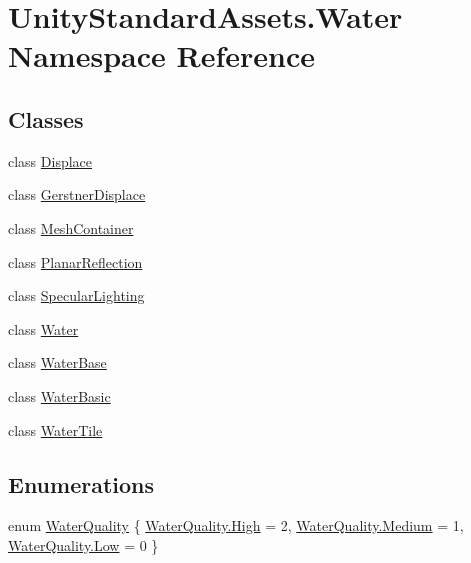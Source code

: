 \hypertarget{namespace_unity_standard_assets_1_1_water}{}\section{Unity\+Standard\+Assets.\+Water Namespace Reference}
\label{namespace_unity_standard_assets_1_1_water}
\subsection*{Classes}
\begin{DoxyCompactItemize}
\item 
class \mbox{\hyperlink{class_unity_standard_assets_1_1_water_1_1_displace}{Displace}}
\item 
class \mbox{\hyperlink{class_unity_standard_assets_1_1_water_1_1_gerstner_displace}{Gerstner\+Displace}}
\item 
class \mbox{\hyperlink{class_unity_standard_assets_1_1_water_1_1_mesh_container}{Mesh\+Container}}
\item 
class \mbox{\hyperlink{class_unity_standard_assets_1_1_water_1_1_planar_reflection}{Planar\+Reflection}}
\item 
class \mbox{\hyperlink{class_unity_standard_assets_1_1_water_1_1_specular_lighting}{Specular\+Lighting}}
\item 
class \mbox{\hyperlink{class_unity_standard_assets_1_1_water_1_1_water}{Water}}
\item 
class \mbox{\hyperlink{class_unity_standard_assets_1_1_water_1_1_water_base}{Water\+Base}}
\item 
class \mbox{\hyperlink{class_unity_standard_assets_1_1_water_1_1_water_basic}{Water\+Basic}}
\item 
class \mbox{\hyperlink{class_unity_standard_assets_1_1_water_1_1_water_tile}{Water\+Tile}}
\end{DoxyCompactItemize}
\subsection*{Enumerations}
\begin{DoxyCompactItemize}
\item 
enum \mbox{\hyperlink{namespace_unity_standard_assets_1_1_water_ac23a9da55bc8ba734d644ff4cc1f15f5}{Water\+Quality}} \{ \mbox{\hyperlink{namespace_unity_standard_assets_1_1_water_ac23a9da55bc8ba734d644ff4cc1f15f5a655d20c1ca69519ca647684edbb2db35}{Water\+Quality.\+High}} = 2, 
\mbox{\hyperlink{namespace_unity_standard_assets_1_1_water_ac23a9da55bc8ba734d644ff4cc1f15f5a87f8a6ab85c9ced3702b4ea641ad4bb5}{Water\+Quality.\+Medium}} = 1, 
\mbox{\hyperlink{namespace_unity_standard_assets_1_1_water_ac23a9da55bc8ba734d644ff4cc1f15f5a28d0edd045e05cf5af64e35ae0c4c6ef}{Water\+Quality.\+Low}} = 0
 \}
\end{DoxyCompactItemize}


